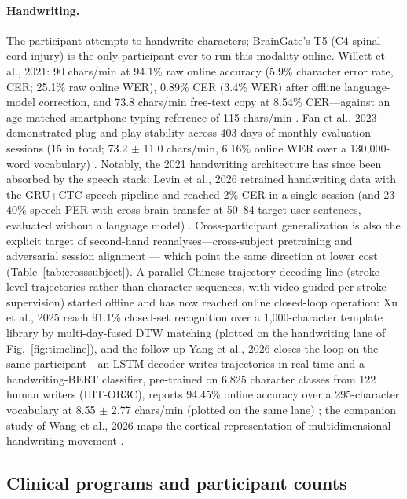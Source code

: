 \documentclass[11pt]{article}
\newcommand{\cpm}{chars/min}
\begin{document}
\paragraph{Handwriting.} The participant attempts to handwrite
characters; BrainGate's T5 (C4 spinal cord injury) is the only
participant ever to run this modality online. Willett et al., 2021: 90
\cpm{} at
94.1\% raw online accuracy (5.9\% character error rate, CER; 25.1\% raw
online WER), 0.89\% CER (3.4\% WER)
after offline language-model correction, and 73.8 \cpm{} free-text copy
at 8.54\% CER---against an age-matched smartphone-typing reference of
115 \cpm{} \cite{willett2021}. Fan et al., 2023 demonstrated plug-and-play
stability across 403 days of monthly evaluation sessions (15 in total;
73.2 $\pm$ 11.0 \cpm{}, 6.16\% online WER over
a 130{,}000-word vocabulary) \cite{fan2023}.
Notably, the 2021 handwriting architecture has since been absorbed by
the speech stack: Levin et al., 2026 retrained handwriting data with the
GRU+CTC speech pipeline and reached 2\% CER in a single session (and
23--40\% speech PER with cross-brain transfer at 50--84 target-user
sentences, evaluated without a language model)
\cite{levin2026}. Cross-participant generalization is also the explicit
target of second-hand reanalyses---cross-subject pretraining
\cite{boccato2026} and adversarial session alignment \cite{align2026}---
which point the same direction at lower cost
(Table~\ref{tab:crosssubject}). A parallel Chinese
trajectory-decoding line
(stroke-level trajectories rather than character sequences, with
video-guided per-stroke supervision) started offline and has now
reached online closed-loop operation: Xu et al., 2025
reach 91.1\% closed-set recognition over a 1{,}000-character template
library by multi-day-fused DTW matching (plotted on the handwriting
lane of Fig.~\ref{fig:timeline}), and the follow-up Yang et al., 2026
closes the loop on the same participant---an LSTM decoder writes
trajectories in real time and a handwriting-BERT classifier, pre-trained
on 6{,}825 character classes from 122 human writers (HIT-OR3C), reports
94.45\% online accuracy over a 295-character vocabulary at 8.55 $\pm$
2.77 \cpm{} (plotted on the same lane) \cite{xu2025, yang2026}; the
companion study of Wang et
al., 2026 maps the cortical representation of multidimensional
handwriting movement \cite{wang2026}.

\subsection{Clinical programs and participant counts}
\label{sec:cohorts}
\end{document}
